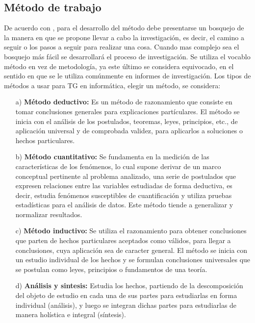 \documentclass[a4paper, 12pt]{article}
\begin{document}
\subsection{Método de trabajo}
De acuerdo con \cite{Erica}, para el desarrollo del método debe presentarse un bosquejo de la manera  en que se propone llevar a cabo la investigación, es decir, el camino a seguir o los pasos a seguir para realizar una cosa. Cuando mas complejo sea el bosquejo  más fácil se desarrollará el proceso de investigación. Se utiliza el vocablo método en vez de metodología, ya este último se considera equivocado, en el sentido en que se le utiliza comúnmente en informes de investigación. 
\vskip 0.3cm
Los tipos de métodos a usar para TG en informática, elegir un método, se considera:
\begin{enumerate}
\item[a)] {\bf Método deductivo:} Es un método de razonamiento que consiste en tomar conclusiones generales para explicaciones partículares. El método se inicia con el análisis de los postulados, teoremas, leyes, principios, etc., de aplicación universal y de comprobada validez, para aplicarlos  a soluciones o hechos particulares. 

\item[b)]{\bf Método cuantitativo:} Se fundamenta en la medición de las características de los fenómenos, lo cual supone derivar de un marco conceptual pertinente al problema analizado, una serie de postulados que expresen relaciones entre las variables estudiadas de forma deductiva, es decir, estudia fenómenos susceptibles de cuantificación y utiliza pruebas estadísticas para el análisis de datos. Este método tiende a generalizar y normalizar resultados. 

\item[c)] {\bf Método inductivo:} Se utiliza el razonamiento para obtener conclusiones que parten de hechos particulares aceptados como válidos, para llegar a conclusiones, cuya aplicación sea de caracter general. El método se inicia con un estudio individual de los hechos y se formulan conclusiones universales que se postulan como leyes, principios o fundamentos de una teoría.

\item[d)] {\bf Análisis y sintesis:} Estudia los hechos, partiendo de la descomposición del objeto de estudio en cada una de sus partes para estudiarlas en forma individual (análisis), y luego se integran dichas partes para estudiarlas de manera holística e integral (síntesis).
\end{enumerate}
\end{document}
